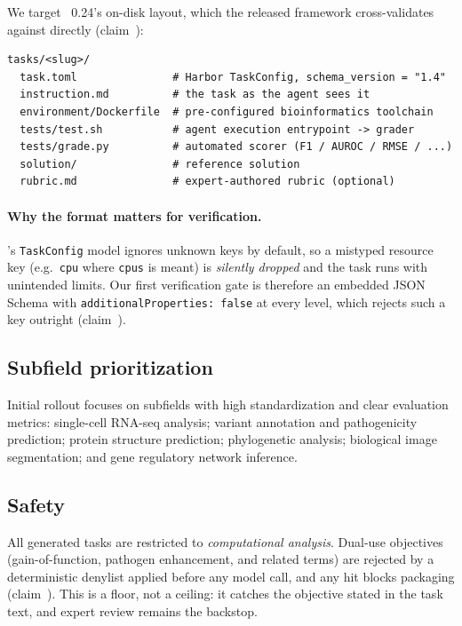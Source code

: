 We target \harbor~0.24's on-disk layout, which the released framework
cross-validates against directly (claim~):

\begin{verbatim}
tasks/<slug>/
  task.toml               # Harbor TaskConfig, schema_version = "1.4"
  instruction.md          # the task as the agent sees it
  environment/Dockerfile  # pre-configured bioinformatics toolchain
  tests/test.sh           # agent execution entrypoint -> grader
  tests/grade.py          # automated scorer (F1 / AUROC / RMSE / ...)
  solution/               # reference solution
  rubric.md               # expert-authored rubric (optional)
\end{verbatim}


\paragraph{Why the format matters for verification.}
\harbor's \texttt{TaskConfig} model ignores unknown keys by default, so a
mistyped resource key (e.g.\ \texttt{cpu} where \texttt{cpus} is meant) is
\emph{silently dropped} and the task runs with unintended limits. Our first
verification gate is therefore an embedded JSON Schema with
\texttt{additionalProperties: false} at every level, which rejects such a key
outright (claim~).

\subsection{Subfield prioritization}

Initial rollout focuses on subfields with high standardization and clear
evaluation metrics: single-cell RNA-seq analysis; variant annotation and
pathogenicity prediction; protein structure prediction; phylogenetic analysis;
biological image segmentation; and gene regulatory network inference.

\subsection{Safety}

All generated tasks are restricted to \emph{computational analysis}. Dual-use
objectives (gain-of-function, pathogen enhancement, and related terms) are
rejected by a deterministic denylist applied before any model call, and any hit
blocks packaging (claim~). This is a floor, not a ceiling: it catches
the objective stated in the task text, and expert review remains the backstop.
